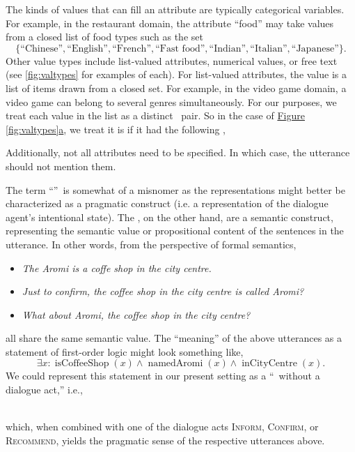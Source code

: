 The kinds of values that can fill an attribute are typically categorical
variables. For example, in the restaurant domain, the attribute ``food'' may
take values from a closed list of food types such as the set
\[\{\textrm{``Chinese''}, \textrm{``English''}, \textrm{``French''},
\textrm{``Fast food''}, \textrm{``Indian''}, \textrm{``Italian''}, \textrm{``Japanese''}\}.\] Other
value types include list-valued attributes, numerical values, or free text (see
\autoref{fig:valtypes} for examples of each). For list-valued attributes, the
value is a list of items drawn from a closed set.  For example, in the video
game domain, a video game can belong to several genres simultaneously.
For our purposes, we treat each value in the 
list as a distinct \attributevalue~pair. So in the case of \hyperref[fig:valtypes]{Figure \ref{fig:valtypes}a},
we treat it is if it had the following \meaningrepresentation,
\begin{center} 
    {} 
    {} 
    {} 
    {} 
    {}
\end{center} 
Additionally, not all attributes need to be specified. In which case, the
utterance should not mention them.






The term ``\meaningrepresentation''~is somewhat of a misnomer as the
representations might better be characterized as a pragmatic construct (i.e. a
representation of the dialogue agent's intentional state).  The
\attributevalues, on the other hand, are a semantic construct, representing the
semantic value or propositional content of the sentences in the utterance. In
other words, from the perspective of formal semantics, \begin{itemize} 
    \item \textit{The Aromi is a coffe shop in the city centre.}  
    \item \textit{Just to confirm, the coffee shop in the city centre is called Aromi?}  
    \item \textit{What
about Aromi, the coffee shop in the city centre?}  \end{itemize} \noindent all
share the same semantic value. The ``meaning'' of the above utterances
as a statement of first-order logic might look something like, \[\exists x :
\operatorname{isCoffeeShop}(x) \wedge \operatorname{namedAromi}(x) \wedge
\operatorname{inCityCentre}(x).\] We could represent this statement in our present
setting as a ``\meaningrepresentation~without a dialogue act,'' i.e.,
\begin{center}  \end{center} ~\\
    
    \noindent which, when combined with one of the dialogue acts
    \textsc{Inform}, \textsc{Confirm},
    or \textsc{Recommend}, yields the pragmatic sense of the respective utterances above.




